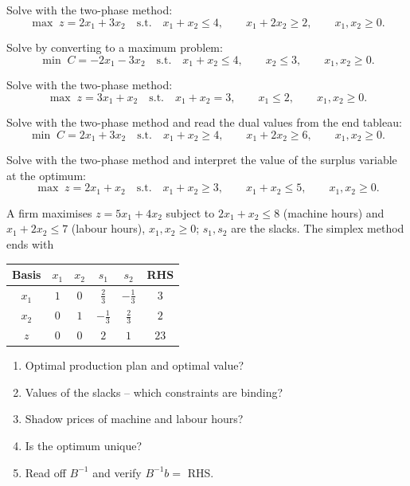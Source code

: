 \begin{problems}
  \item Solve with the two-phase method:
        \[
          \max\; z=2x_{1}+3x_{2}
          \quad\text{s.t.}\quad
          x_{1}+x_{2}\le 4,\qquad
          x_{1}+2x_{2}\ge 2,\qquad
          x_{1},x_{2}\ge 0 .
        \]

  \item Solve by converting to a maximum problem:
        \[
          \min\; C=-2x_{1}-3x_{2}
          \quad\text{s.t.}\quad
          x_{1}+x_{2}\le 4,\qquad
          x_{2}\le 3,\qquad
          x_{1},x_{2}\ge 0 .
        \]

  \item Solve with the two-phase method:
        \[
          \max\; z=3x_{1}+x_{2}
          \quad\text{s.t.}\quad
          x_{1}+x_{2}=3,\qquad
          x_{1}\le 2,\qquad
          x_{1},x_{2}\ge 0 .
        \]

  \item Solve with the two-phase method and read the dual values from the
        end tableau:
        \[
          \min\; C=2x_{1}+3x_{2}
          \quad\text{s.t.}\quad
          x_{1}+x_{2}\ge 4,\qquad
          x_{1}+2x_{2}\ge 6,\qquad
          x_{1},x_{2}\ge 0 .
        \]

  \item Solve with the two-phase method and interpret the value of the
        surplus variable at the optimum:
        \[
          \max\; z=2x_{1}+x_{2}
          \quad\text{s.t.}\quad
          x_{1}+x_{2}\ge 3,\qquad
          x_{1}+x_{2}\le 5,\qquad
          x_{1},x_{2}\ge 0 .
        \]

  \item A firm maximises $z=5x_{1}+4x_{2}$ subject to
        $2x_{1}+x_{2}\le 8$ (machine hours) and $x_{1}+2x_{2}\le 7$ (labour
        hours), $x_{1},x_{2}\ge 0$; $s_{1},s_{2}$ are the slacks. The
        simplex method ends with
        \begin{center}
        \begin{tabular}{c|cccc|c}
        Basis & $x_{1}$ & $x_{2}$ & $s_{1}$ & $s_{2}$ & RHS\\
        \hline
        $x_{1}$ & $1$ & $0$ & $\tfrac{2}{3}$ & $-\tfrac{1}{3}$ & $3$\\
        $x_{2}$ & $0$ & $1$ & $-\tfrac{1}{3}$ & $\tfrac{2}{3}$ & $2$\\
        \hline
        $z$ & $0$ & $0$ & $2$ & $1$ & $23$\\
        \end{tabular}
        \end{center}
        \begin{enumerate}[label=(\alph*),leftmargin=2.2em,itemsep=0.2ex]
          \item Optimal production plan and optimal value?
          \item Values of the slacks -- which constraints are binding?
          \item Shadow prices of machine and labour hours?
          \item Is the optimum unique?
          \item Read off $B^{-1}$ and verify $B^{-1}b=$ RHS.
        \end{enumerate}


\end{problems}
